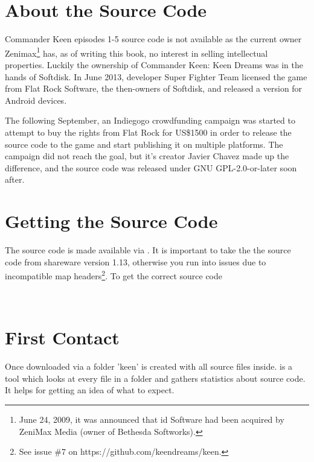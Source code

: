 \documentclass[book.tex]{subfiles}
\begin{document}
\label{chapter_software_architecture}
\section{About the Source Code}
Commander Keen episodes 1-5 source code is not available as the current owner Zenimax\footnote{June 24, 2009, it was announced that id Software had been acquired by ZeniMax Media (owner of Bethesda Softworks).} has, as of writing this book, no interest in selling intellectual properties. Luckily the ownership of Commander Keen: Keen Dreams was in the hands of Softdisk. In June 2013, developer Super Fighter Team licensed the game from Flat Rock Software, the then-owners of Softdisk, and released a version for Android devices. \\
\par
The following September, an Indiegogo crowdfunding campaign was started to attempt to buy the rights from Flat Rock for US\$1500 in order to release the source code to the game and start publishing it on multiple platforms. The campaign did not reach the goal, but it's creator Javier Chavez made up the difference, and the source code was released under GNU GPL-2.0-or-later soon after.

\section{Getting the Source Code}
\par
The source code is made available via . It is important to take the the source code from shareware version 1.13, otherwise you run into issues due to incompatible map headers\footnote{See issue \#7 on https://github.com/keendreams/keen.}. To get the correct source code \\
\par
{}\\
\par
\section{First Contact}
Once downloaded via  a folder 'keen' is created with all source files inside.
 is a tool which looks at every file in a folder and gathers statistics about source code. It helps for getting an idea of what to expect.\\
\par

\begin{minipage}{\textwidth}

\end{minipage}
\end{document}
